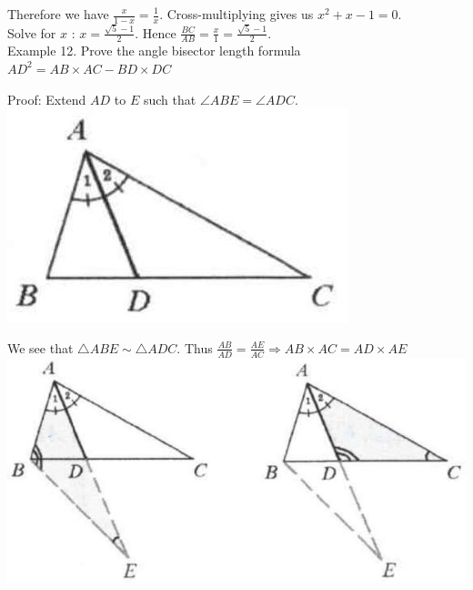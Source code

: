 \documentclass[10pt]{article}
\begin{document}
Therefore we have \(\frac{x}{1-x}=\frac{1}{x}\). Cross-multiplying gives us \(x^{2}+x-1=0\).\\
Solve for \(x\) : \(x=\frac{\sqrt{5}-1}{2}\). Hence \(\frac{B C}{A B}=\frac{x}{1}=\frac{\sqrt{5}-1}{2}\).\\
Example 12. Prove the angle bisector length formula\\
\(A D^{2}=A B \times A C-B D \times D C\)

Proof:
Extend \(A D\) to \(E\) such that \(\angle A B E=\angle A D C\).\\
\includegraphics[max width=\textwidth, center]{2025_04_17_97bc1f7e44d93c271a88g-062}

We see that \(\triangle A B E \sim \triangle A D C\). Thus \(\frac{A B}{A D}=\frac{A E}{A C} \Rightarrow A B \times A C=A D \times A E\)\\
\includegraphics[max width=\textwidth, center]{2025_04_17_97bc1f7e44d93c271a88g-063(1)}
\end{document}
